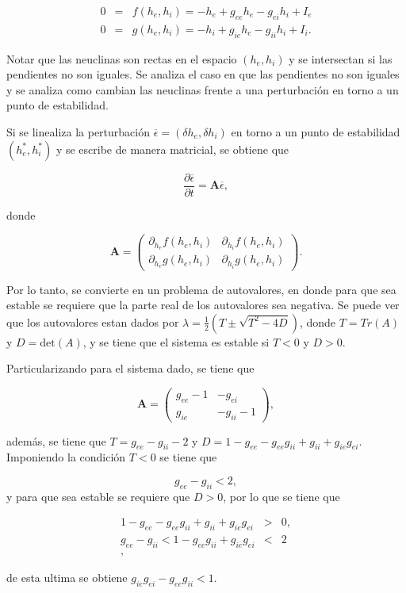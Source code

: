 \documentclass[11pt, twocolumn]{article}
\begin{document}
\begin{eqnarray*}
    0  &=& f(h_e, h_i) = -h_e + g_{ee} h_e - g_{ei} h_i + I_e\\
    0  &=& g(h_e, h_i) = -h_i + g_{ie} h_e - g_{ii} h_i + I_i.
\end{eqnarray*}

Notar que las neuclinas son rectas en el espacio \((h_e, h_i)\) y se intersectan si las pendientes no son iguales. Se analiza el caso en que las pendientes no son iguales y se analiza como cambian las neuclinas frente a una perturbación en torno a un punto de estabilidad. 

Si se linealiza la perturbación \(\overline{\epsilon} = (\delta h_e, \delta h_i)\) en torno a un punto de estabilidad \((h_e^*, h_i^*)\) y se escribe de manera matricial, se obtiene que 

\begin{equation*}
    \frac{\partial \overline{\epsilon}}{\partial t} = \mathbf{A} \overline{\epsilon},
\end{equation*}

\noindent donde 

\begin{equation*}
    \mathbf{A} = \begin{pmatrix}
        \partial_{h_e} f(h_e, h_i) & \partial_{h_i} f(h_e, h_i) \\
        \partial_{h_e} g(h_e, h_i) & \partial_{h_i}g(h_e, h_i)
    \end{pmatrix}.
\end{equation*}

Por lo tanto, se convierte en un problema de autovalores, en donde para que sea estable se requiere que la parte real de los autovalores sea negativa. Se puede ver que los autovalores estan dados por \( \lambda = \frac{1}{2} (T \pm \sqrt{T^2-4D})\), donde \(T = Tr(A)\) y \(D = \text{det}(A)\), y se tiene que el sistema es estable si \(T < 0\) y \(D > 0\).

Particularizando para el sistema dado, se tiene que

\begin{equation}
    \mathbf{A} = \begin{pmatrix}
        g_{ee} - 1 & -g_{ei} \\
        g_{ie} & -g_{ii} - 1
    \end{pmatrix},
\end{equation}

además, se tiene que \( T = g_{ee} - g_{ii} -2\) y \(D = 1 -g_{ee} - g_{ee}g_{ii} + g_{ii} + g_{ie}g_{ei}\). Imponiendo la condición \(T < 0\) se tiene que

\begin{equation*}
    g_{ee} - g_{ii} < 2,
\end{equation*}
\noindent y para que sea estable se requiere que \(D > 0\), por lo que se tiene que

\begin{eqnarray*}
    1 - g_{ee} - g_{ee}g_{ii} + g_{ii} + g_{ie}g_{ei} &>& 0, \\
    g_{ee} - g_{ii} < 1 - g_{ee}g_{ii} + g_{ie}g_{ei} &<& 2\\,
\end{eqnarray*}

\noindent de esta ultima se obtiene \(g_{ie} g_{ei} - g_{ee}g_{ii} < 1\). 
\end{document}

